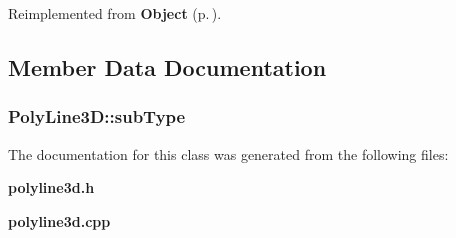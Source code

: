 Reimplemented from {\bf Object} {\rm (p.\,\pageref{classObject_a3})}.

\subsection{Member Data Documentation}
\subsubsection{ Poly\-Line3D::sub\-Type\hspace{0.3cm}{\tt  [private]}}\label{classPolyLine3D_o0}




The documentation for this class was generated from the following files:\begin{CompactItemize}
\item 
{\bf polyline3d.h}\item 
{\bf polyline3d.cpp}\end{CompactItemize}
